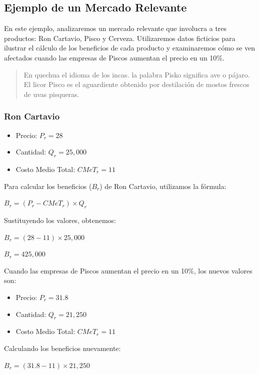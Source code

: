 \documentclass[
  doc,
  floatsintext,
  longtable,
  a4paper,
  nolmodern,
  notxfonts,
  notimes,
  12pt,
  colorlinks=true,linkcolor=blue,citecolor=blue,urlcolor=blue]{apa7}
\providecommand{\tightlist}{%
  \setlength{\itemsep}{0pt}\setlength{\parskip}{0pt}}
\begin{document}
\subsection{Ejemplo de un Mercado
Relevante}\label{ejemplo-de-un-mercado-relevante}

En este ejemplo, analizaremos un mercado relevante que involucra a tres
productos: Ron Cartavio, Pisco y Cerveza. Utilizaremos datos ficticios
para ilustrar el cálculo de los beneficios de cada producto y
examinaremos cómo se ven afectados cuando las empresas de Piscos
aumentan el precio en un 10\%.

\begin{quote}
En quechua el idioma de los incas. la palabra Pisko significa ave o
pájaro. El licor Pisco es el aguardiente obtenido por destilación de
mostos frescos de uvas pisqueras.
\end{quote}

\subsubsection{Ron Cartavio}\label{ron-cartavio}

\begin{itemize}
\tightlist
\item
  Precio: \(P_r = 28\)
\item
  Cantidad: \(Q_r = 25,000\)
\item
  Costo Medio Total: \(CMeT_r = 11\)
\end{itemize}

Para calcular los beneficios (\(B_r\)) de Ron Cartavio, utilizamos la
fórmula:

\(B_r = (P_r - CMeT_r) \times Q_r\)

Sustituyendo los valores, obtenemos:

\(B_r = (28 - 11) \times 25,000\)

\(B_r = 425,000\)

Cuando las empresas de Piscos aumentan el precio en un 10\%, los nuevos
valores son:

\begin{itemize}
\tightlist
\item
  Precio: \(P_r = 31.8\)
\item
  Cantidad: \(Q_r = 21,250\)
\item
  Costo Medio Total: \(CMeT_r = 11\)
\end{itemize}

Calculando los beneficios nuevamente:

\(B_r = (31.8 - 11) \times 21,250\)
\end{document}
